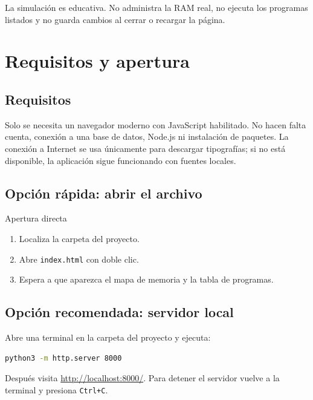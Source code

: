 \documentclass[11pt,a4paper]{article}
\newcommand{\archivo}[1]{\texttt{#1}}
\begin{document}
\begin{aviso}
La simulación es educativa. No administra la RAM real, no ejecuta los programas
listados y no guarda cambios al cerrar o recargar la página.
\end{aviso}

\section{Requisitos y apertura}

\subsection{Requisitos}

Solo se necesita un navegador moderno con JavaScript habilitado. No hacen falta
cuenta, conexión a una base de datos, Node.js ni instalación de paquetes. La
conexión a Internet se usa únicamente para descargar tipografías; si no está
disponible, la aplicación sigue funcionando con fuentes locales.

\subsection{Opción rápida: abrir el archivo}

\begin{paso}{Apertura directa}
\begin{enumerate}
  \item Localiza la carpeta del proyecto.
  \item Abre \archivo{index.html} con doble clic.
  \item Espera a que aparezca el mapa de memoria y la tabla de programas.
\end{enumerate}
\end{paso}

\subsection{Opción recomendada: servidor local}

Abre una terminal en la carpeta del proyecto y ejecuta:

\begin{lstlisting}[language=bash]
python3 -m http.server 8000
\end{lstlisting}

Después visita \url{http://localhost:8000/}. Para detener el servidor vuelve a la
terminal y presiona \texttt{Ctrl+C}.
\end{document}
